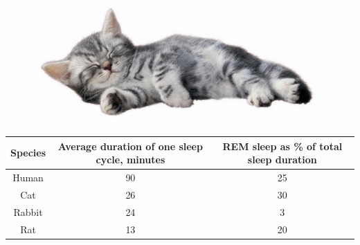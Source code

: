 \documentclass{article}
\begin{document}
\begin{figure}[h]
\centering
\includegraphics[width=0.8\linewidth]{cat.png}
\end{figure}

\begin{tabular}{ |c|c|c| }
\hline
Species & Average duration of one sleep cycle, minutes & REM sleep as \% of total sleep duration \\
\hline
Human & 90 & 25 \\
\hline
Cat & 26 & 30 \\
\hline
Rabbit & 24 & 3 \\
\hline
Rat & 13 & 20 \\
\hline
\end{tabular}
\end{document}
